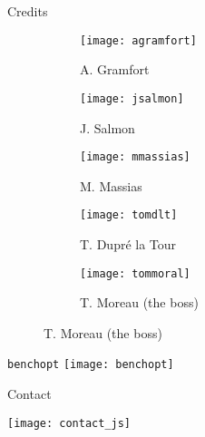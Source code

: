 \documentclass[unknownkeysallowed]{beamer}
\begin{document}
\begin{frame}{Credits}
	
\begin{figure}
     \centering
     \begin{subfigure}[b]{0.188\textwidth}
         \centering
         \texttt{[image: agramfort]}
         \caption{A. Gramfort}
     \end{subfigure}
     \hfill
     \begin{subfigure}[b]{0.188\textwidth}
         \centering
		\texttt{[image: jsalmon]}
         \caption{J. Salmon}
     \end{subfigure}
	 \hfill
     \begin{subfigure}[b]{0.188\textwidth}
         \centering
		 \texttt{[image: mmassias]}
         \caption{M. Massias}
     \end{subfigure}
     \hfill
     \begin{subfigure}[b]{0.188\textwidth}
         \centering
		\texttt{[image: tomdlt]}
        \caption{T. Dupré la Tour}
     \end{subfigure}
	 \hfill
     \begin{subfigure}[b]{0.188\textwidth}
         \centering
		\texttt{[image: tommoral]}
        \caption{T. Moreau (the boss)}
     \end{subfigure}
\end{figure}
\end{frame}


\begin{frame}{\texttt{benchopt}}
    \centering
    \texttt{[image: benchopt]}\\
\end{frame}


\begin{frame}{Contact}

\vspace{0.4cm}
\centering
\texttt{[image: contact\_js]}
\end{frame}



\end{document}
